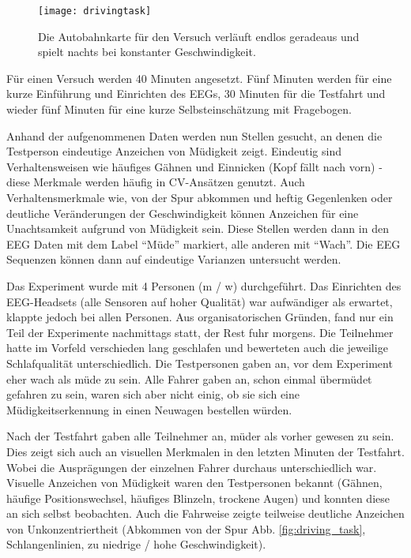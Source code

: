 \begin{figure}[h] 
  \begin{center}
    \texttt{[image: drivingtask]}
    \caption[Driving Task Screenshot]{Die Autobahnkarte für den Versuch verläuft endlos geradeaus und spielt nachts bei konstanter Geschwindigkeit. \label{fig:drivingtask}}
  \end{center}
\end{figure}

Für einen Versuch werden 40 Minuten angesetzt. Fünf Minuten werden für eine kurze Einführung und Einrichten des EEGs, 30 Minuten für die Testfahrt und wieder fünf Minuten für eine kurze Selbsteinschätzung mit Fragebogen.

Anhand der aufgenommenen Daten werden nun Stellen gesucht, an denen die Testperson eindeutige Anzeichen von Müdigkeit zeigt. Eindeutig sind Verhaltensweisen wie häufiges Gähnen und Einnicken (Kopf fällt nach vorn) - diese Merkmale werden häufig in CV-Ansätzen genutzt. 
Auch Verhaltensmerkmale wie, von der Spur abkommen und heftig Gegenlenken oder deutliche Veränderungen der Geschwindigkeit können Anzeichen für eine Unachtsamkeit aufgrund von Müdigkeit sein. Diese Stellen werden dann in den EEG Daten mit dem Label "`Müde"' markiert, alle anderen mit "`Wach"'. Die EEG Sequenzen können dann auf eindeutige Varianzen untersucht werden. 

Das Experiment wurde mit 4 Personen (m / w) durchgeführt. Das Einrichten des EEG-Headsets (alle Sensoren auf hoher Qualität) war aufwändiger als erwartet, klappte jedoch bei allen Personen. Aus organisatorischen Gründen, fand nur ein Teil der Experimente nachmittags statt, der Rest fuhr morgens. Die Teilnehmer hatte im Vorfeld verschieden lang geschlafen und bewerteten auch die jeweilige Schlafqualität unterschiedlich. Die Testpersonen gaben an, vor dem Experiment eher wach als müde zu sein. Alle Fahrer gaben an, schon einmal übermüdet gefahren zu sein, waren sich aber nicht einig, ob sie sich eine Müdigkeitserkennung in einen Neuwagen bestellen würden.

Nach der Testfahrt gaben alle Teilnehmer an, müder als vorher gewesen zu sein. Dies zeigt sich auch an visuellen Merkmalen in den letzten Minuten der Testfahrt. Wobei die Ausprägungen der einzelnen Fahrer durchaus unterschiedlich war. Visuelle Anzeichen von Müdigkeit waren den Testpersonen bekannt (Gähnen, häufige Positionswechsel, häufiges Blinzeln, trockene Augen) und konnten diese an sich selbst beobachten. Auch die Fahrweise zeigte teilweise deutliche Anzeichen von Unkonzentriertheit (Abkommen von der Spur Abb. \ref{fig:driving_task}, Schlangenlinien, zu niedrige / hohe Geschwindigkeit).


